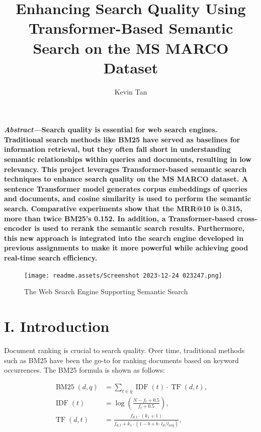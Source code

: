 \documentclass[11pt]{article}
\title{\bf Enhancing Search Quality Using Transformer-Based Semantic Search on the MS MARCO Dataset}
\author{Kevin Tan}
\date{}
\begin{document}
\maketitle

\textbf{\emph{Abstract---}Search quality is essential for web search
engines. Traditional search methods like BM25 have served as baselines
for information retrieval, but they often fall short in understanding
semantic relationships within queries and documents, resulting in low
relevancy. This project leverages Transformer-based semantic search
techniques to enhance search quality on the MS MARCO dataset. A sentence
Transformer model generates corpus embeddings of queries and documents,
and cosine similarity is used to perform the semantic search.
Comparative experiments show that the MRR@10 is 0.315, more than twice
BM25's 0.152. In addition, a Transformer-based cross-encoder is used to
rerank the semantic search results. Furthermore, this new approach is
integrated into the search engine developed in previous assignments to
make it more powerful while achieving good real-time search efficiency.}

\begin{figure}
\texttt{[image: readme.assets/Screenshot 2023-12-24 023247.png]}
\caption{The Web Search Engine Supporting Semantic Search}
\label{semantic search results}
\end{figure}

\hypertarget{i-introduction}{%
\section{I. Introduction}\label{i-introduction}}

Document ranking is crucial to search quality. Over time, traditional
methods such as BM25 have been the go-to for ranking documents based on
keyword occurrences. The BM25 formula \cite{c1} is shown as follows:

\begin{align}
\operatorname{BM25}(d, q) &= \sum_{t \in q} \operatorname{IDF}(t) \cdot \operatorname{TF}(d, t), \\
\operatorname{IDF}(t) &= \log \left(\frac{N-f_t+0.5}{f_t+0.5}\right), \\
\operatorname{TF}(d, t) &= \frac{f_{d, t} \cdot\left(k_1+1\right)}{f_{d, t}+k_1 \cdot\left(1-b+b \cdot l_d / l_{\mathrm{avg}}\right)},
\end{align}
\end{document}
